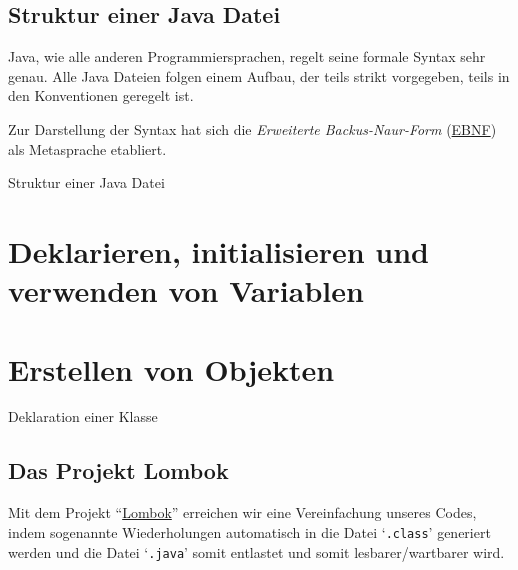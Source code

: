 \subsection{Struktur einer Java Datei}

Java, wie alle anderen Programmiersprachen, regelt seine formale Syntax
sehr genau. Alle Java Dateien folgen einem Aufbau, der teils strikt vorgegeben, 
teils in den Konventionen geregelt ist.

Zur Darstellung der Syntax hat sich die {\em Erweiterte Backus-Naur-Form} 
(\href{https://de.wikipedia.org/wiki/Erweiterte_Backus-Naur-Form}{EBNF})
als Metasprache etabliert.


\mode*
\begin{listing}[H]
\caption{Struktur einer Java Datei}
\label{lst:java-file}
\end{listing}

\section{Deklarieren, initialisieren und verwenden von Variablen}

\section{Erstellen von Objekten}

\begin{listing}[H]
\caption{Deklaration einer Klasse}
\label{lst:java-file}
\end{listing}



\subsection{Das Projekt Lombok}

Mit dem Projekt ``\href{https://projectlombok.org/}{Lombok}'' erreichen wir 
eine Vereinfachung unseres Codes, indem sogenannte Wiederholungen automatisch 
in die Datei `{\tt .class}' generiert werden und die Datei `{\tt .java}' somit 
entlastet und somit lesbarer/wartbarer wird.

